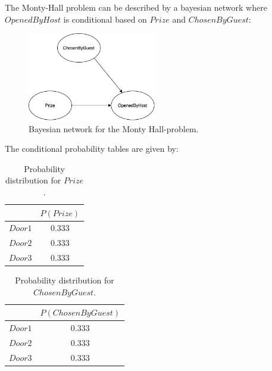 \documentclass[10pt, a4paper, english]{../Template/NTNUoving}
\begin{document}
\clearpage
\begin{oppgave}
    \setcounter{Punkt}{2}
    \begin{punkt}
        The Monty-Hall problem can be described by a bayesian network where $OpenedByHost$ is conditional based on $Prize$ and $ChosenByGuest$:

        \begin{figure}[h]
            \centering
            \includegraphics[width=0.5\textwidth]{BN.png}
            \caption{Bayesian network for the Monty Hall-problem.}

            \end{figure}

        The conditional probability tables are given by:
        \begin{table}[h!]
            \centering
            \begin{tabular}{|c|c|}
                \hline
                & $P(Prize)$ \\ [0.5ex]
                \hline
                $Door1$ & 0.333 \\ [1.0ex]
                $Door2$ & 0.333 \\ [1.0ex]
                $Door3$ & 0.333 \\ [1.0ex]
                \hline
            \end{tabular}
            \caption{Probability distribution for $Prize$.}
        \end{table}

        \begin{table}[h!]
            \centering
            \begin{tabular}{|c|c|}
                \hline
                & $P(ChosenByGuest)$ \\ [0.5ex]
                \hline
                $Door1$ & 0.333 \\ [1.0ex]
                $Door2$ & 0.333 \\ [1.0ex]
                $Door3$ & 0.333 \\ [1.0ex]
                \hline
            \end{tabular}
            \caption{Probability distribution for $ChosenByGuest$.}
        \end{table}


\end{punkt}
\end{oppgave}
\end{document}
